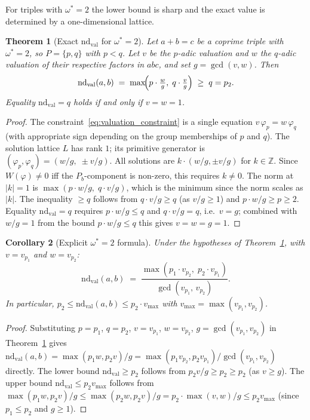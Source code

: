 \documentclass[12pt]{article}
\newtheorem{theorem}{Theorem}
\newtheorem{corollary}[theorem]{Corollary}
\theoremstyle{definition}
\begin{document}
For triples with $\omega^* = 2$ the lower bound is sharp and the exact value
is determined by a one-dimensional lattice.

\begin{theorem}[Exact $\mathrm{nd}_{\mathrm{val}}$ for $\omega^* = 2$]\label{thm:nd_omega2}
  Let $a + b = c$ be a coprime triple with $\omega^* = 2$,
  so $P = \{p, q\}$ with $p < q$.  Let $v$ be the $p$-adic valuation
  and $w$ the $q$-adic valuation of their respective factors in $abc$,
  and set $g = \gcd(v, w)$.  Then
  \[
  \mathrm{nd}_{\mathrm{val}}(a,b)
  \;=\; \max\!\Bigl(p\cdot\tfrac{w}{g},\; q\cdot\tfrac{v}{g}\Bigr)
  \;\ge\; q = p_2.
  \]
  Equality $\mathrm{nd}_{\mathrm{val}} = q$ holds if and only if $v = w = 1$.
\end{theorem}

\begin{proof}
  The constraint~\eqref{eq:valuation_constraint} is a single equation $v\,\varphi_p = w\,\varphi_q$ (with
  appropriate sign depending on the group memberships of $p$ and $q$).
  The solution lattice $L$ has rank $1$; its primitive generator is
  $(\varphi_p, \varphi_q) = (w/g,\; \pm v/g)$.  All solutions are
  $k \cdot (w/g, \pm v/g)$ for $k \in \mathbb{Z}$.  Since $W(\varphi) \ne 0$ iff
  the $P_b$-component is non-zero, this requires $k \ne 0$.
  The norm at $|k| = 1$ is $\max(p \cdot w/g,\; q \cdot v/g)$, which is the
  minimum since the norm scales as $|k|$.  The inequality $\ge q$ follows from
  $q \cdot v/g \ge q$ (as $v/g \ge 1$) and $p \cdot w/g \ge p \ge 2$.
  Equality $\mathrm{nd}_{\mathrm{val}} = q$ requires $p \cdot w/g \le q$ and $q \cdot v/g = q$,
  i.e.\ $v = g$; combined with $w/g = 1$ from the bound $p \cdot w/g \le q$ this
  gives $v = w = g = 1$.
\end{proof}

\begin{corollary}[Explicit $\omega^*=2$ formula]\label{cor:nd_omega2_simp}
  Under the hypotheses of Theorem~\ref{thm:nd_omega2}, with $v = v_{p_1}$ and $w = v_{p_2}$:
  \[
    \mathrm{nd}_{\mathrm{val}}(a,b) \;=\; \frac{\max(p_1\cdot v_{p_2},\; p_2\cdot v_{p_1})}{\gcd(v_{p_1},\, v_{p_2})}.
  \]
  In particular, $p_2 \le \mathrm{nd}_{\mathrm{val}}(a,b) \le p_2 \cdot v_{\max}$ with $v_{\max} = \max(v_{p_1}, v_{p_2})$.
\end{corollary}

\begin{proof}
  Substituting $p = p_1$, $q = p_2$, $v = v_{p_1}$, $w = v_{p_2}$, $g = \gcd(v_{p_1},v_{p_2})$
  in Theorem~\ref{thm:nd_omega2} gives $\mathrm{nd}_{\mathrm{val}}(a,b) = \max(p_1 w, p_2 v)/g
  = \max(p_1 v_{p_2}, p_2 v_{p_1})/\gcd(v_{p_1},v_{p_2})$ directly.
  The lower bound $\mathrm{nd}_{\mathrm{val}} \ge p_2$ follows from $p_2 v/g \ge p_2 \ge p_2$ (as $v \ge g$).
  The upper bound $\mathrm{nd}_{\mathrm{val}} \le p_2 v_{\max}$ follows from
  $\max(p_1 w, p_2 v)/g \le \max(p_2 w, p_2 v)/g = p_2 \cdot \max(v,w)/g \le p_2 v_{\max}$
  (since $p_1 \le p_2$ and $g \ge 1$).
\end{proof}
\end{document}
